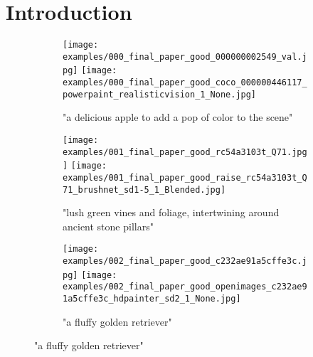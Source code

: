 \section{Introduction}
\label{sec:intro}

\begin{figure*}[!htb]
    \centering
    \begin{subfigure}{\textwidth}
        \begin{subfigure}{0.32\textwidth}
            \texttt{[image: examples/000\_final\_paper\_good\_000000002549\_val.jpg]}
            \texttt{[image: examples/000\_final\_paper\_good\_coco\_000000446117\_powerpaint\_realisticvision\_1\_None.jpg]}
            \caption{"a delicious apple to add a pop of color to the scene"}
        \end{subfigure}
        \hfill
        \begin{subfigure}{0.32\textwidth}
            \texttt{[image: examples/001\_final\_paper\_good\_rc54a3103t\_Q71.jpg]}
            \texttt{[image: examples/001\_final\_paper\_good\_raise\_rc54a3103t\_Q71\_brushnet\_sd1-5\_1\_Blended.jpg]}
            \caption{"lush green vines and foliage, intertwining around ancient stone pillars"}
        \end{subfigure}
        \hfill
        \begin{subfigure}{0.32\textwidth}
            \texttt{[image: examples/002\_final\_paper\_good\_c232ae91a5cffe3c.jpg]}
            \texttt{[image: examples/002\_final\_paper\_good\_openimages\_c232ae91a5cffe3c\_hdpainter\_sd2\_1\_None.jpg]}
            \caption{"a fluffy golden retriever"}
        \end{subfigure}
    \end{subfigure}
    
    \vspace{1em}
    

\end{figure*}
